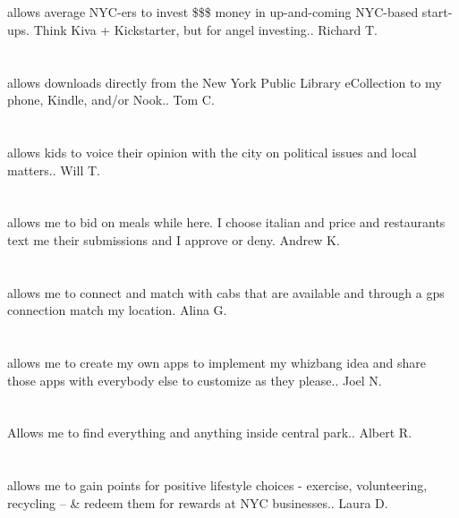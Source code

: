 \section{}allows average NYC-ers to invest \$\$\$ money in up-and-coming NYC-based start-ups. Think Kiva + Kickstarter,  but for angel investing.. Richard T.
\section{}allows downloads directly from the New York Public Library eCollection to my phone,  Kindle,  and/or Nook.. Tom C.
\section{} allows kids to voice their opinion with the city on political issues and local matters.. Will T.
\section{}allows me to bid on meals while here.  I choose italian and price and restaurants text me their submissions and I approve or deny. Andrew K.
\section{}allows me to connect and match with cabs that are available and through a gps connection match my location. Alina G.
\section{}allows me to create my own apps to implement my whizbang idea and share those apps with everybody else to customize as they please.. Joel N.
\section{} Allows me to find everything and anything inside central park.. Albert R.
\section{}allows me to gain points for positive lifestyle choices - exercise,  volunteering,  recycling --  \& redeem them for rewards at NYC businesses.. Laura D.

